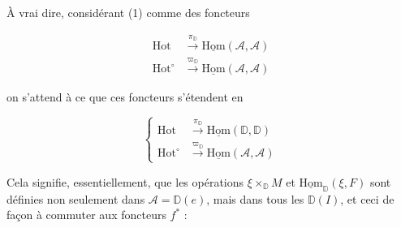 À vrai dire, considérant (1) comme des foncteurs

\[\begin{aligned}
\mathrm{Hot}&\xrightarrow{\pi_{\mathbb D}}\underline{\mathrm{Hom}}(\mathcal A,\mathcal A)\\
\mathrm{Hot}^{\circ}&\xrightarrow{\varpi_{\mathbb D}}\underline{\mathrm{Hom}}(\mathcal A,\mathcal A)
\end{aligned}\]

on s'attend à ce que ces foncteurs s'étendent en

\[
\left\{\begin{aligned}
\mathrm{Hot}&\xrightarrow{\pi_{\mathbb D}}\underline{\mathrm{Hom}}(\mathbb D,\mathbb D)\\
\mathrm{Hot}^{\circ}&\xrightarrow{\varpi_{\mathbb D}}\underline{\mathrm{Hom}}(\mathcal A,\mathcal A)
\end{aligned}\right.\tag*{(2)}
\]

Cela signifie, essentiellement, que  les opérations $\xi\times_{\mathbb D}M$ et $\underline{\mathrm{Hom}}_{\mathbb D}(\xi,F)$ sont définies non seulement dans $\mathcal A=\mathbb D(e)$, mais dans tous les $\mathbb D(I)$, et ceci de façon à commuter aux foncteurs $f^*$ :

